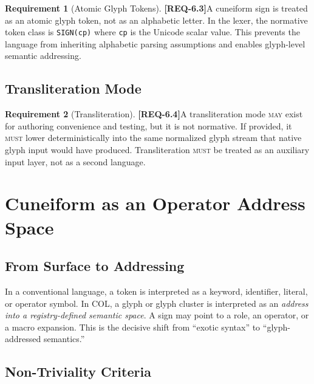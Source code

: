 \documentclass[11pt,a4paper,twoside]{article}
\theoremstyle{definition}
\newtheorem{requirement}{Requirement}[section]
\theoremstyle{remark}
\newcommand{\req}[1]{\textbf{\textcolor{reqred}{[REQ-#1]}}}
\newcommand{\must}{\textsc{must}}
\newcommand{\may}{\textsc{may}}
\begin{document}
\begin{requirement}[Atomic Glyph Tokens]
\label{req:atomic-glyph}
\req{6.3}\quad A cuneiform sign is treated as an atomic glyph token, not as an alphabetic letter. In the lexer, the normative token class is \texttt{SIGN(cp)} where \texttt{cp} is the Unicode scalar value. This prevents the language from inheriting alphabetic parsing assumptions and enables glyph-level semantic addressing.
\end{requirement}

\subsection{Transliteration Mode}

\begin{requirement}[Transliteration]
\label{req:translit}
\req{6.4}\quad A transliteration mode \may{} exist for authoring convenience and testing, but it is not normative. If provided, it \must{} lower deterministically into the same normalized glyph stream that native glyph input would have produced. Transliteration \must{} be treated as an auxiliary input layer, not as a second language.
\end{requirement}



\section{Cuneiform as an Operator Address Space}
\label{sec:operator-space}

\subsection{From Surface to Addressing}

In a conventional language, a token is interpreted as a keyword, identifier, literal, or operator symbol. In COL, a glyph or glyph cluster is interpreted as an \emph{address into a registry-defined semantic space}. A sign may point to a role, an operator, or a macro expansion. This is the decisive shift from ``exotic syntax'' to ``glyph-addressed semantics.''

\subsection{Non-Triviality Criteria}
\label{sec:nontrivial-criteria}
\end{document}
